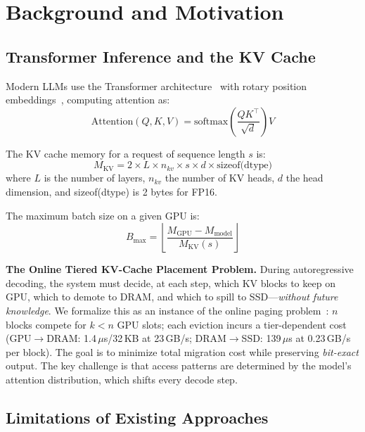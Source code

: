 \documentclass[conference]{IEEEtran}
\begin{document}
\section{Background and Motivation}
\subsection{Transformer Inference and the KV Cache}

Modern LLMs use the Transformer architecture~\cite{transformer} with rotary position embeddings~\cite{rope}, computing attention as:
\begin{equation}
\text{Attention}(Q, K, V) = \text{softmax}\!\left(\frac{QK^\top}{\sqrt{d}}\right) V
\end{equation}

The KV cache memory for a request of sequence length $s$ is:
\begin{equation}
M_{\text{KV}} = 2 \times L \times n_{kv} \times s \times d \times \text{sizeof(dtype)}
\end{equation}
where $L$ is the number of layers, $n_{kv}$ the number of KV heads, $d$ the head dimension, and sizeof(dtype) is 2 bytes for FP16.

The maximum batch size on a given GPU is:
\begin{equation}
B_{\max} = \left\lfloor \frac{M_{\text{GPU}} - M_{\text{model}}}{M_{\text{KV}}(s)} \right\rfloor
\end{equation}

\textbf{The Online Tiered KV-Cache Placement Problem.} During autoregressive decoding, the system must decide, at each step, which KV blocks to keep on GPU, which to demote to DRAM, and which to spill to SSD---\emph{without future knowledge}. We formalize this as an instance of the online paging problem~\cite{sleator-tarjan}: $n$ blocks compete for $k < n$ GPU slots; each eviction incurs a tier-dependent cost (GPU$\to$DRAM: 1.4\,$\mu$s/32\,KB at 23\,GB/s; DRAM$\to$SSD: 139\,$\mu$s at 0.23\,GB/s per block). The goal is to minimize total migration cost while preserving \emph{bit-exact} output. The key challenge is that access patterns are determined by the model's attention distribution, which shifts every decode step.

\subsection{Limitations of Existing Approaches}
\end{document}

